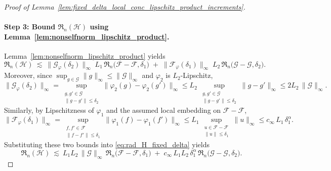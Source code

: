 \documentclass[11pt]{article}
\theoremstyle{plain}
\theoremstyle{definition} %
\begin{document}
\begin{proof}[Proof of Lemma~\ref{lem:fixed_delta_local_conc_lipschitz_product_increments}]
\paragraph{Step 3: Bound $\mathfrak R_n(\mathcal H)$ using Lemma~\ref{lem:nonselfnorm_lipschitz_product}.}
Lemma~\ref{lem:nonselfnorm_lipschitz_product} yields
\begin{equation}
\label{eq:rad_H_fixed_delta}
\mathfrak R_n(\mathcal H)
\ \lesssim\
\|\mathcal G_{\varphi}(\delta_2)\|_\infty\; L_1\,\mathfrak R_n\bigl(\mathcal F-\mathcal F,\delta_1\bigr)
\;+\;
\|\mathcal F_{\varphi}(\delta_1)\|_\infty\; L_2\,\mathfrak R_n\bigl(\mathcal G-\mathcal G,\delta_2\bigr).
\end{equation}
Moreover, since $\sup_{g\in\mathcal G}\|g\|_\infty\le \|\mathcal G\|_\infty$ and $\varphi_2$ is $L_2$-Lipschitz,
\[
\|\mathcal G_{\varphi}(\delta_2)\|_\infty
=
\sup_{\substack{g,g'\in\mathcal G\\ \|g-g'\|\le \delta_2}}
\|\varphi_2(g)-\varphi_2(g')\|_\infty
\le
L_2\,\sup_{\substack{g,g'\in\mathcal G\\ \|g-g'\|\le \delta_2}}
\|g-g'\|_\infty
\le
2L_2\,\|\mathcal G\|_\infty.
\]
Similarly, by Lipschitzness of $\varphi_1$ and the assumed local embedding on $\mathcal F-\mathcal F$,
\[
\|\mathcal F_{\varphi}(\delta_1)\|_\infty
=
\sup_{\substack{f,f'\in\mathcal F\\ \|f-f'\|\le \delta_1}}
\|\varphi_1(f)-\varphi_1(f')\|_\infty
\le
L_1\,\sup_{\substack{u\in\mathcal F-\mathcal F\\ \|u\|\le \delta_1}}\|u\|_\infty
\le
c_\infty\,L_1\,\delta_1^\alpha.
\]
Substituting these two bounds into \eqref{eq:rad_H_fixed_delta} yields
\begin{equation}
\label{eq:rad_H_fixed_delta_simplified}
\mathfrak R_n(\mathcal H)
\ \lesssim\
L_1L_2\,\|\mathcal G\|_\infty\,\mathfrak R_n\bigl(\mathcal F-\mathcal F,\delta_1\bigr)
\;+\;
c_\infty\,L_1L_2\,\delta_1^\alpha\,\mathfrak R_n\bigl(\mathcal G-\mathcal G,\delta_2\bigr).
\end{equation}


\end{proof}
\end{document}
